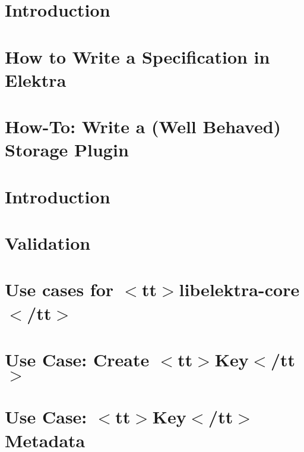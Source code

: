 \let\mypdfximage\pdfximage\def\pdfximage{\immediate\mypdfximage}\documentclass[twoside]{book}
\newcommand{\+}{\discretionary{\mbox{\scriptsize$\hookleftarrow$}}{}{}}
\begin{document}
\chapter{Introduction}
\label{doc_tutorials_run_reformatting_script_with_docker_md}

\chapter{How to Write a Specification in Elektra}
\label{doc_tutorials_specification_md}

\chapter{How-\/\+To\+: Write a (Well Behaved) Storage Plugin}
\label{doc_tutorials_storage-plugins_md}

\chapter{Introduction}
\label{doc_tutorials_using_podman_instead_of_docker_md}

\chapter{Validation}
\label{doc_tutorials_validation_md}

\chapter{Use cases for $<$tt$>$libelektra-\/core$<$/tt$>$}
\label{doc_usecases_core_README_md}

\chapter{Use Case\+: Create $<$tt$>$Key$<$/tt$>$}
\label{doc_usecases_core_UC_key_create_md}

\chapter{Use Case\+: $<$tt$>$Key$<$/tt$>$ Metadata}
\label{doc_usecases_core_UC_key_meta_md}

\end{document}
